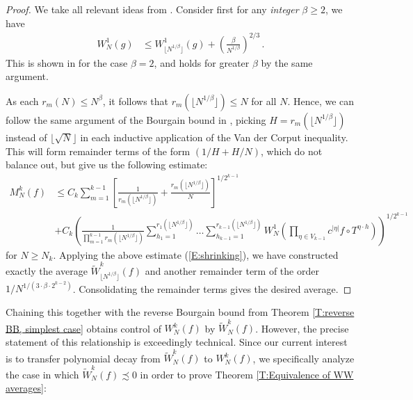 \documentclass[11pt, oneside]{amsart}   	%
\newcommand{\1}{\mathbbm{1}}
\newcommand{\floor}[1]{\lfloor#1\rfloor}
\theoremstyle{definition}
\begin{document}
\begin{proof}
We take all relevant ideas from \cite{assani2024higherorderwienerwintnersystems}. Consider first for any \textit{integer} $\beta\geq 2$, we have
\begin{align}\label{E:shrinking}
W_N^1(g) &\leq  W_{\floor{N^{1/\beta}}}^1(g) + \left(\frac{\beta}{N^{1/\beta}}\right)^{2/3} \, .
\end{align}
This is shown in \cite[Theorem 6.3, $3a \implies 4a$]{assani2024higherorderwienerwintnersystems} for the case $\beta=2$, and holds for greater $\beta$ by the same argument.

As each $r_m(N) \leq N^\beta$, it follows that $r_m(\floor{N^{1/\beta}}) \leq N$ for all $N$. Hence, we can follow the same argument of the Bourgain bound in \cite{assani2024higherorderwienerwintnersystems}, picking $H = r_m(\floor{N^{1/\beta}})$ instead of $\floor{\sqrt{N}}$ in each inductive application of the Van der Corput inequality. This will form remainder terms of the form $(1/H + H/N)$, which do not balance out, but give us the following estimate:
\begin{align*}
M_N^k(f) &\leq C_{k} \sum_{m=1}^{k-1}\left[\frac{1}{r_m(\floor{N^{1/\beta}})} + \frac{r_m(\floor{N^{1/\beta}})}{N} \right]^{1/2^{k-1}} \\
&+ C_k\left(\frac{1}{\prod_{m=1}^{k-1} r_m(\floor{N^{1/\beta}})} \sum_{h_1 = 1}^{r_1(\floor{N^{1/\beta}})} \dots \sum_{h_{k-1} = 1}^{r_{k-1}(\floor{N^{1/\beta}})} W_N^1\left( \prod_{\eta\in V_{k-1}} c^{|\eta|} f \circ T^{\eta \cdot h}\right)\right)^{1/2^{k-1}}
\end{align*}
for $N\geq N_k$. Applying the above estimate (\ref{E:shrinking}), we have constructed exactly the average $\widetilde W_{\floor{N^{1/\beta}}}^k(f)$ and another remainder term of the order $1/N^{1/(3 \cdot \beta \cdot 2^{k-2})}$. Consolidating the remainder terms gives the desired average.
\end{proof}
Chaining this together with the reverse Bourgain bound from Theorem \ref{T:reverse BB, simplest case} obtains control of $W_N^k(f)$ by $\widetilde W_N^k(f)$. However, the precise statement of this relationship is exceedingly technical. Since our current interest is to transfer polynomial decay from $\widetilde W_N^k(f)$ to $ W_N^k(f)$, we specifically analyze the case in which $\widetilde W_N^k(f) \precsim 0$ in order to prove Theorem \ref{T:Equivalence of WW averages}:
\end{document}
